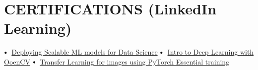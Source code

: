 \documentclass[letterpaper,11pt]{article}
\newcommand\sbullet[1][.5]{\mathbin{\vcenter{\hbox{\scalebox{#1}{$\bullet$}}}}}
\begin{document}
\section{CERTIFICATIONS (LinkedIn Learning)}

$\sbullet[.75] \hspace{0.1cm}$ {\href{certificateLink.com}{Deploying Scalable ML models for Data Science}} \hspace{1.6cm}
$\sbullet[.75] \hspace{0.1cm}$ {\href{certificateLink.com}{Intro to Deep Learning with OoenCV}} \hspace{2.59cm}
$\sbullet[.75] \hspace{0.2cm}${\href{certificateLink.com} {Transfer Learning for images using PyTorch Essential training}}\\
\end{document}
